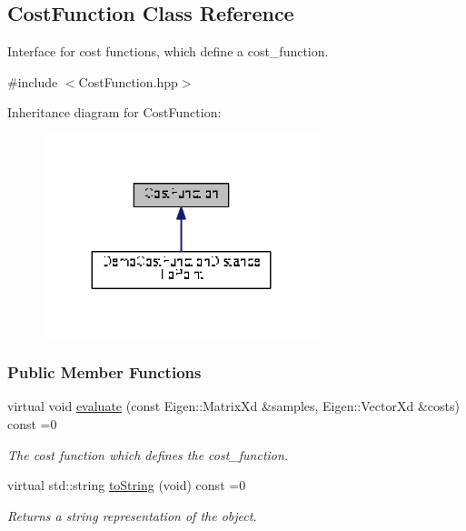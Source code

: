 \hypertarget{classDmpBbo_1_1CostFunction}{\subsection{Cost\+Function Class Reference}
\label{classDmpBbo_1_1CostFunction}
}


Interface for cost functions, which define a cost\+\_\+function.  




{\ttfamily \#include $<$Cost\+Function.\+hpp$>$}



Inheritance diagram for Cost\+Function\+:
\nopagebreak
\begin{figure}[H]
\begin{center}
\leavevmode
\includegraphics[width=227pt]{classDmpBbo_1_1CostFunction__inherit__graph}
\end{center}
\end{figure}
\subsubsection*{Public Member Functions}
\begin{DoxyCompactItemize}
\item 
virtual void \hyperlink{classDmpBbo_1_1CostFunction_a4468247a33250384422560fce57bf2ed}{evaluate} (const Eigen\+::\+Matrix\+Xd \&samples, Eigen\+::\+Vector\+Xd \&costs) const =0
\begin{DoxyCompactList}\small\item\em The cost function which defines the cost\+\_\+function. \end{DoxyCompactList}\item 
virtual std\+::string \hyperlink{classDmpBbo_1_1CostFunction_af084bff2ddd6233e9a898faa23f6195c}{to\+String} (void) const =0
\begin{DoxyCompactList}\small\item\em Returns a string representation of the object. \end{DoxyCompactList}\end{DoxyCompactItemize}
